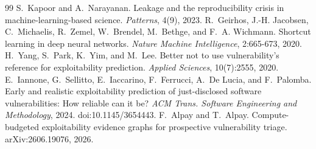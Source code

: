 \documentclass[11pt,a4paper]{article}
\begin{document}
\begin{thebibliography}{99}
 S.~Kapoor and A.~Narayanan. Leakage and the reproducibility crisis in machine-learning-based science. \emph{Patterns}, 4(9), 2023.
 R.~Geirhos, J.-H. Jacobsen, C.~Michaelis, R.~Zemel, W.~Brendel, M.~Bethge, and F.~A. Wichmann. Shortcut learning in deep neural networks. \emph{Nature Machine Intelligence}, 2:665-673, 2020.
 H.~Yang, S.~Park, K.~Yim, and M.~Lee. Better not to use vulnerability's reference for exploitability prediction. \emph{Applied Sciences}, 10(7):2555, 2020.
 E.~Iannone, G.~Sellitto, E.~Iaccarino, F.~Ferrucci, A.~De Lucia, and F.~Palomba. Early and realistic exploitability prediction of just-disclosed software vulnerabilities: How reliable can it be? \emph{ACM Trans. Software Engineering and Methodology}, 2024. doi:10.1145/3654443.
 F.~Alpay and T.~Alpay. Compute-budgeted exploitability evidence graphs for prospective vulnerability triage. arXiv:2606.19076, 2026.
\end{thebibliography}
\end{document}
